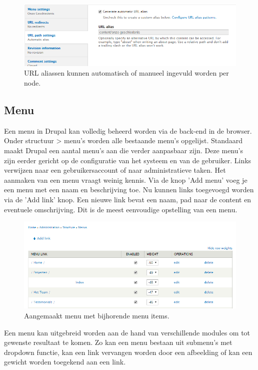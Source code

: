 \begin{figure}[!ht]
  \includegraphics[width=\textwidth]{img/dr-theme-alias.png}
  \centering
  \caption{URL aliassen kunnen automatisch of manueel ingevuld worden per node.}
  \label{fig:Drupal thema alias.}
\end{figure}

\subsection{Menu}
Een menu in Drupal kan volledig beheerd worden via de back-end in de browser. Onder structuur > menu's  worden alle bestaande menu's opgelijst. Standaard maakt Drupal een aantal menu's aan die verder aanpasbaar zijn. Deze menu's zijn eerder gericht op de configuratie van het systeem en van de gebruiker. Links verwijzen naar een gebruikersaccount of naar administratieve taken. Het aanmaken van een menu vraagt weinig kennis. Via de knop 'Add menu' voeg je een menu met een naam en beschrijving toe. Nu kunnen links toegevoegd worden via de 'Add link' knop. Een nieuwe link bevat een naam, pad naar de content en eventuele omschrijving. Dit is de meest eenvoudige opstelling van een menu. 

\begin{figure}[!ht]
  \includegraphics[width=\textwidth]{img/dr-theme-menu.png}
  \centering
  \caption{Aangemaakt menu met bijhorende menu items.}
  \label{fig:Drupal thema menu.}
\end{figure}

\noindent
Een menu kan uitgebreid worden aan de hand van verschillende modules om tot gewenste resultaat te komen. Zo kan een menu bestaan uit submenu's met dropdown functie,  kan een link vervangen worden door een afbeelding of kan een gewicht worden toegekend aan een link. 

